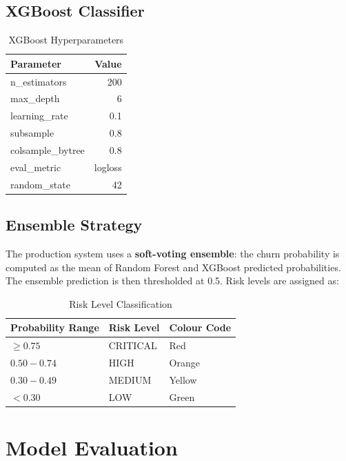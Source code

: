 \documentclass[12pt, a4paper]{report}
\begin{document}
\subsection{XGBoost Classifier}

\begin{table}[H]
\centering
\caption{XGBoost Hyperparameters}
\label{tab:xgb_params}
\begin{tabular}{l r}
\toprule
\textbf{Parameter} & \textbf{Value} \\
\midrule
n\_estimators & 200 \\
max\_depth & 6 \\
learning\_rate & 0.1 \\
subsample & 0.8 \\
colsample\_bytree & 0.8 \\
eval\_metric & logloss \\
random\_state & 42 \\
\bottomrule
\end{tabular}
\end{table}

\subsection{Ensemble Strategy}

The production system uses a \textbf{soft-voting ensemble}: the churn probability is computed as the mean of Random Forest and XGBoost predicted probabilities. The ensemble prediction is then thresholded at 0.5. Risk levels are assigned as:

\begin{table}[H]
\centering
\caption{Risk Level Classification}
\label{tab:risk}
\begin{tabular}{l l l}
\toprule
\textbf{Probability Range} & \textbf{Risk Level} & \textbf{Colour Code} \\
\midrule
$\geq 0.75$ & CRITICAL & \textcolor{criticalred}{Red} \\
$0.50 - 0.74$ & HIGH & \textcolor{highorg}{Orange} \\
$0.30 - 0.49$ & MEDIUM & \textcolor{mediumyel}{Yellow} \\
$< 0.30$ & LOW & \textcolor{lowgreen}{Green} \\
\bottomrule
\end{tabular}
\end{table}

\section{Model Evaluation}
\end{document}

